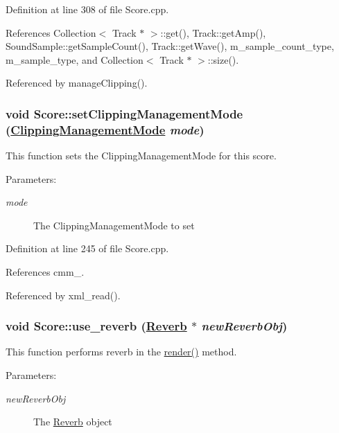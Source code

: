 Definition at line 308 of file Score.cpp.

References Collection$<$ Track $\ast$ $>$::get(), Track::get\-Amp(), Sound\-Sample::get\-Sample\-Count(), Track::get\-Wave(), m\_\-sample\_\-count\_\-type, m\_\-sample\_\-type, and Collection$<$ Track $\ast$ $>$::size().

Referenced by manage\-Clipping().\hypertarget{classScore_a3}{
\subsubsection[setClippingManagementMode]{\setlength{\rightskip}{0pt plus 5cm}void Score::set\-Clipping\-Management\-Mode (\hyperlink{classScore_w6}{Clipping\-Management\-Mode} {\em mode})}}
\label{classScore_a3}


This function sets the Clipping\-Management\-Mode for this score. \begin{Desc}
\item[Parameters:]
\begin{description}
\item[{\em mode}]The Clipping\-Management\-Mode to set \end{description}
\end{Desc}


Definition at line 245 of file Score.cpp.

References cmm\_\-.

Referenced by xml\_\-read().\hypertarget{classScore_a5}{
\subsubsection[use\_\-reverb]{\setlength{\rightskip}{0pt plus 5cm}void Score::use\_\-reverb (\hyperlink{classReverb}{Reverb} $\ast$ {\em new\-Reverb\-Obj})}}
\label{classScore_a5}


This function performs reverb in the \hyperlink{classScore_a1}{render()} method. \begin{Desc}
\item[Parameters:]
\begin{description}
\item[{\em new\-Reverb\-Obj}]The \hyperlink{classReverb}{Reverb} object \end{description}
\end{Desc}


